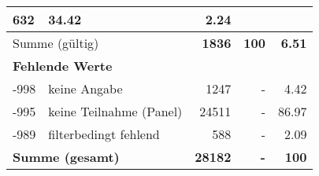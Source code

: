 \begin{longtable}{lXrrr}
       \num{632} &
       \num[round-mode=places,round-precision=2]{34.42} &
         \num[round-mode=places,round-precision=2]{2.24} \\
     \midrule
     \multicolumn{2}{l}{Summe (gültig)} &
       \textbf{\num{1836}} &
     \textbf{\num{100}} &
       \textbf{\num[round-mode=places,round-precision=2]{6.51}} \\
     \multicolumn{5}{l}{\textbf{Fehlende Werte}}\\
       -998 &
       keine Angabe &
         \num{1247} &
        - &
         \num[round-mode=places,round-precision=2]{4.42} \\
       -995 &
       keine Teilnahme (Panel) &
         \num{24511} &
        - &
         \num[round-mode=places,round-precision=2]{86.97} \\
       -989 &
       filterbedingt fehlend &
         \num{588} &
        - &
         \num[round-mode=places,round-precision=2]{2.09} \\
     \midrule
     \multicolumn{2}{l}{\textbf{Summe (gesamt)}} &
          \textbf{\num{28182}} &
        \textbf{-} &
        \textbf{\num{100}} \\
     \bottomrule
     \end{longtable}
     
